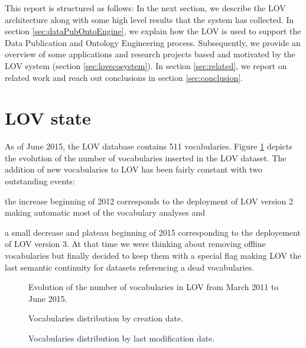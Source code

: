 \documentclass{iosart2c}
\begin{document}
This report is structured as follows: In the next section, we describe the LOV architecture along with some high level results that the system has collected. In section \ref{sec:dataPubOntoEngine}, we explain how the LOV is used to support the Data Publication and Ontology Engineering process. Subsequently, we provide an overview of some applications and research projects based and motivated by the LOV system (section \ref{sec:lovecosystem}). In section \ref{sec:related}, we report on related work and reach out conclusions in section \ref{sec:conclusion}.

\section{LOV state}
As of June 2015, the LOV database contains 511 vocabularies. Figure \ref{fig:evolLOV} depicts the evolution of the number of vocabularies inserted in the LOV dataset. The addition of new vocabularies to LOV has been fairly constant with two outstanding events: 
\begin{inparaenum}[1)] 
	\item the increase beginning of 2012 corresponds to the deployment of LOV version 2 making automatic most of the vocabulary analyses and
	\item a small decrease and plateau beginning of 2015 corresponding to the deployement of LOV version 3. At that time we were thinking about removing offline vocabularies but finally decided to keep them with a special flag making LOV the last semantic continuity for datasets referencing a dead vocabularies.
\end{inparaenum} 

\begin{figure}[htb]
   
   \caption{\label{fig:evolLOV} Evolution of the number of vocabularies in LOV from March 2011 to June 2015.}
\end{figure}

\begin{figure}[htb]

\caption{\label{fig:creaevol} Vocabularies distribution by creation date.}
\end{figure}

\begin{figure}[htb]

\caption{\label{fig:modifevol} Vocabularies distribution by last modification date.}
\end{figure}
\end{document}
